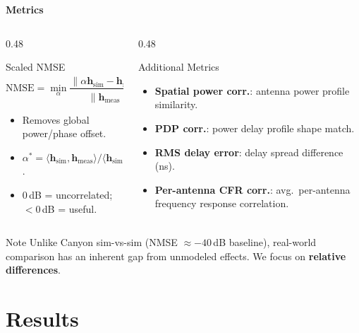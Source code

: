 \documentclass[
    aspectratio=169
]{beamer}
\begin{document}

\begin{frame}{\textbf{Metrics}}
\footnotesize
\begin{columns}[T]
\begin{column}{0.48\textwidth}
\begin{block}{Scaled NMSE}
$$\text{NMSE} = \min_\alpha \frac{\|\alpha \mathbf{h}_\text{sim} - \mathbf{h}_\text{meas}\|^2}{\|\mathbf{h}_\text{meas}\|^2}$$
\vspace{-0.2cm}
\begin{itemize}
    \item Removes global power/phase offset.
    \item $\alpha^* = \langle \mathbf{h}_\text{sim}, \mathbf{h}_\text{meas}\rangle / \langle \mathbf{h}_\text{sim}, \mathbf{h}_\text{sim}\rangle$.
    \item 0\,dB = uncorrelated; $<$0\,dB = useful.
\end{itemize}
\end{block}
\end{column}
\begin{column}{0.48\textwidth}
\begin{block}{Additional Metrics}
\begin{itemize}
    \item \textbf{Spatial power corr.}: antenna power profile similarity.
    \item \textbf{PDP corr.}: power delay profile shape match.
    \item \textbf{RMS delay error}: delay spread difference (ns).
    \item \textbf{Per-antenna CFR corr.}: avg.\ per-antenna frequency response correlation.
\end{itemize}
\end{block}
\end{column}
\end{columns}
\vspace{0.1cm}
\begin{block}{Note}
Unlike Canyon sim-vs-sim (NMSE $\approx -40$\,dB baseline), real-world comparison has an inherent gap from unmodeled effects. We focus on \textbf{relative differences}.
\end{block}
\normalsize
\end{frame}

\section{Results}
\end{document}
